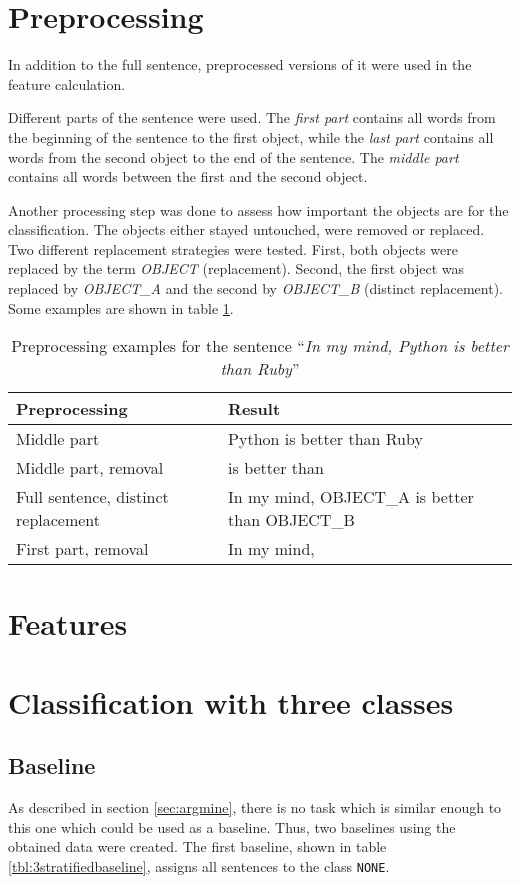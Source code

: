 \section{Preprocessing}
In addition to the full sentence, preprocessed versions of it were used in the feature calculation.

Different parts of the sentence were used. The \emph{first part} contains all words from the beginning of the sentence to the first object, while the \emph{last part} contains all words from the second object to the end of the sentence. The \emph{middle part} contains all words between the first and the second object.

Another processing step was done to assess how important the objects are for the classification. The objects either stayed untouched, were removed or replaced. Two different replacement strategies were tested. First, both objects were replaced by the term \emph{OBJECT} (replacement). Second, the first object was replaced by \emph{OBJECT\_A} and the second by \emph{OBJECT\_B} (distinct replacement). Some examples are shown in table \ref{preprocessing_example}.

\begin{table}[h]
\centering

\caption{Preprocessing examples for the sentence \enquote{\emph{In my mind, Python is better than Ruby}}}
\label{preprocessing_example}
\begin{tabularx}{\linewidth}{lX}
\toprule
Preprocessing & Result \\ \midrule
Middle part & Python is better than Ruby \\
Middle part, removal & is better than \\
Full sentence, distinct replacement &In my mind, OBJECT\_A is better than OBJECT\_B \\
First part, removal & In my mind, \\
\bottomrule
\end{tabularx}

\end{table}


\section{Features}


\section{Classification with three classes}
\subsection{Baseline}
\label{sec:baseline}
As described in section \ref{sec:argmine}, there is no task which is similar enough to this one which could be used as a baseline. Thus, two baselines using the obtained data were created. The first baseline, shown in table \ref{tbl:3stratifiedbaseline}, assigns all sentences to the class \texttt{NONE}.

